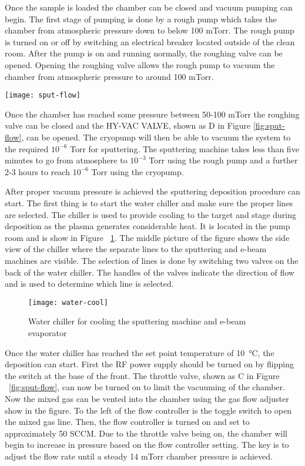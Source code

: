 Once the sample is loaded the chamber can be closed and vacuum pumping can begin.
The first stage of pumping is done by a rough pump which takes the chamber from atmospheric pressure down to below 100 mTorr.
The rough pump is turned on or off by switching an electrical breaker located outside of the clean room.
After the pump is on and running normally, the roughing valve can be opened.
Opening the roughing valve allows the rough pump to vacuum the chamber from atmospheric pressure to around 100 mTorr.

\begin{sidewaysfigure}
\texttt{[image: sput-flow]}
\caption{This is a diagram of the Sputtering machine vacuum and gas system. Each valve is connected to a pressurized air line.}
\label{fig:sput-flow}
\end{sidewaysfigure}

Once the chamber has reached some pressure between 50-100 mTorr the roughing valve can be closed and the HY-VAC VALVE, shown as D in Figure \ref{fig:sput-flow}, can be opened.
The cryopump will then be able to vacuum the system to the required $10^{-6}$ Torr for sputtering.
The sputtering machine takes less than five minutes to go from atmosphere to $10^{-3}$ Torr using the rough pump and a further 2-3 hours to reach $10^{-6}$ Torr using the cryopump.

After proper vacuum pressure is achieved the sputtering deposition procedure can start.
The first thing is to start the water chiller and make sure the proper lines are selected.
The chiller is used to provide cooling to the target and stage during deposition as the plasma generates considerable heat.
It is located in the pump room and is show in Figure ~\ref{fig:water-cool}.
The middle picture of the figure shows the side view of the chiller where the separate lines to the sputtering and e-beam machines are visible.
The selection of lines is done by switching two valves on the back of the water chiller.
The handles of the valves indicate the direction of flow and is used to determine which line is selected.
\begin{figure}[htpb]
\centering
\texttt{[image: water-cool]}
\caption{Water chiller for cooling the sputtering machine and e-beam evaporator}
\label{fig:water-cool}
\end{figure}

Once the water chiller has reached the set point temperature of \SI{10}{\celsius}, the deposition can start.
First the RF power supply should be turned on by flipping the switch at the base of the front.
The throttle valve, shown as C in Figure ~\ref{fig:sput-flow}, can now be turned on to limit the vacuuming of the chamber.
Now the mixed gas can be vented into the chamber using the gas flow adjuster show in the figure.
To the left of the flow controller is the toggle switch to open the mixed gas line.
Then, the flow controller is turned on and set to approximately 50 SCCM.
Due to the throttle valve being on, the chamber will begin to increase in pressure based on the flow controller setting.
The key is to adjust the flow rate until a steady 14 mTorr chamber pressure is achieved.

